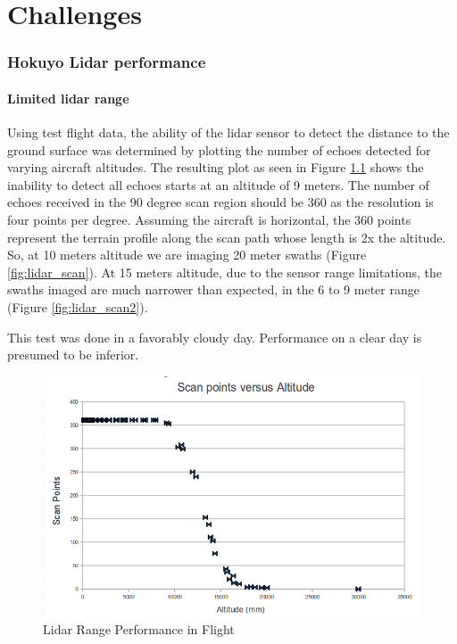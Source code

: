 \documentclass[a4paper,11pt]{report}
\begin{document}
\chapter{Challenges}

\subsection{Hokuyo Lidar performance}

\subsubsection{Limited lidar range}

Using test flight data, the ability of the lidar sensor to detect the distance to the ground surface was determined by plotting the number of echoes detected for varying aircraft altitudes. The resulting plot as seen in Figure \ref{fig:lidar_perf} shows the inability to detect all echoes starts at an altitude of 9 meters. The number of echoes received in the 90 degree scan region should be 360 as the resolution is four points per degree. Assuming the aircraft is horizontal, the 360 points represent the terrain profile along the scan path whose length is 2x the altitude. So, at 10 meters altitude we are imaging 20 meter swaths (Figure \ref{fig:lidar_scan}). At 15 meters altitude, due to the sensor range limitations, the swaths imaged are much narrower than expected, in the 6 to 9 meter range (Figure \ref{fig:lidar_scan2}).

This test was done in a favorably cloudy day. Performance on a clear day is presumed to be inferior.

\begin{figure}[ht]
 \centering
 \includegraphics[width=12cm]{scanpt_v_alt.png}
 \caption{Lidar Range Performance in Flight}
 \label{fig:lidar_perf}
\end{figure}
\end{document}
